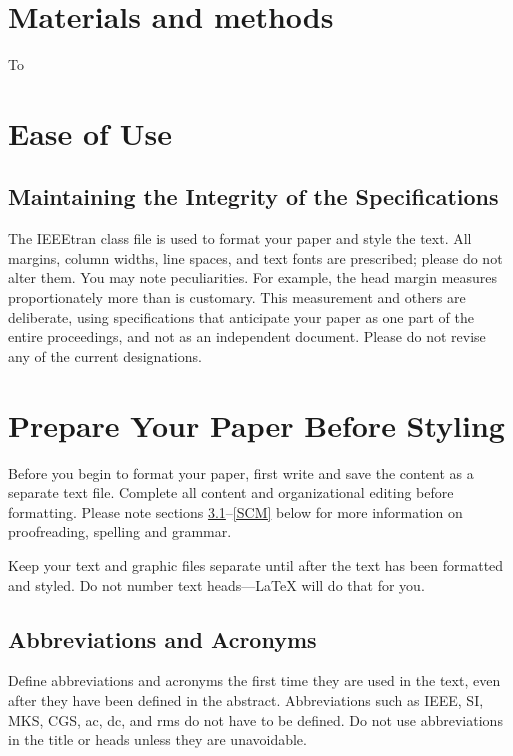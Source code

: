 \documentclass[conference]{IEEEtran}
\begin{document}
\section{Materials and methods}
To 




\section{Ease of Use}

\subsection{Maintaining the Integrity of the Specifications}

The IEEEtran class file is used to format your paper and style the text. All margins, 
column widths, line spaces, and text fonts are prescribed; please do not 
alter them. You may note peculiarities. For example, the head margin
measures proportionately more than is customary. This measurement 
and others are deliberate, using specifications that anticipate your paper 
as one part of the entire proceedings, and not as an independent document. 
Please do not revise any of the current designations.

\section{Prepare Your Paper Before Styling}
Before you begin to format your paper, first write and save the content as a 
separate text file. Complete all content and organizational editing before 
formatting. Please note sections \ref{AA}--\ref{SCM} below for more information on 
proofreading, spelling and grammar.

Keep your text and graphic files separate until after the text has been 
formatted and styled. Do not number text heads---{\LaTeX} will do that 
for you.

\subsection{Abbreviations and Acronyms}\label{AA}
Define abbreviations and acronyms the first time they are used in the text, 
even after they have been defined in the abstract. Abbreviations such as 
IEEE, SI, MKS, CGS, ac, dc, and rms do not have to be defined. Do not use 
abbreviations in the title or heads unless they are unavoidable.
\end{document}
